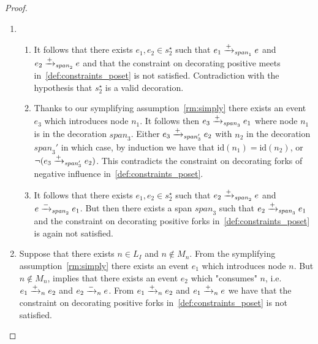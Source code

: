 \begin{proof}
  \begin{enumerate}
  \item
  \begin{enumerate}
  \item It follows that there exists $e_1,e_2\in s_2^{\star}$ such that $e_1\mathrel{\xrightarrow{+}}_{\mathit{span}_1} e$ and $e_2\mathrel{\xrightarrow{+}}_{\mathit{span}_2} e$ and that the constraint on decorating positive meets in~\autoref{def:constraints_poset} is not satisfied. Contradiction with the hypothesis that $s_2^{\star}$ is a valid decoration.
  \item Thanks to our symplifying assumption~\autoref{rm:simply} there exists an event $e_3$ which introduces node $n_1$. It follows then $e_3\mathrel{\xrightarrow{+}}_{\mathit{span}_3} e_1$ where node $n_1$ is in the decoration $\mathit{span}_3$. Either $e_3\mathrel{\xrightarrow{+}}_{\mathit{span}_3'} e_2$ with $n_2$ in the decoration $\mathit{span}_3'$ in which case, by induction we have that $\text{id}(n_1) = \text{id}(n_2)$, or $\neg(e_3\mathrel{\xrightarrow{+}}_{\mathit{span}_3'} e_2)$. This contradicts the constraint on decorating forks of negative influence in~\autoref{def:constraints_poset}.
  \item It follows that there exists $e_1,e_2\in s_2^{\star}$ such that $e_2\mathrel{\xrightarrow{+}}_{\mathit{span}_2} e$ and $e\mathrel{\xrightarrow{-}}_{\mathit{span}_2} e_1$. But then there exists a span ${\mathit{span}_3}$ such that $e_2\mathrel{\xrightarrow{+}}_{\mathit{span}_3} e_1$ and the constraint on decorating positive forks in~\autoref{def:constraints_poset} is again not satisfied.
  \end{enumerate}
  \item Suppose that there exists $n\in L_I$ and $n\notin M_n$. From the symplifying assumption~\autoref{rm:simply} there exists an event $e_1$ which introduces node $n$. But $n\notin M_n$, implies that there exists an event $e_2$ which "consumes" $n$, i.e. $e_1\mathrel{\xrightarrow{+}}_n e_2$ and $e_2\mathrel{\xrightarrow{-}}_n e$. %
From $e_1\mathrel{\xrightarrow{+}}_n e_2$ and $e_1\mathrel{\xrightarrow{+}}_n e$ we have that the constraint on decorating positive forks in~\autoref{def:constraints_poset} is not satisfied.
  \end{enumerate}
\end{proof}


